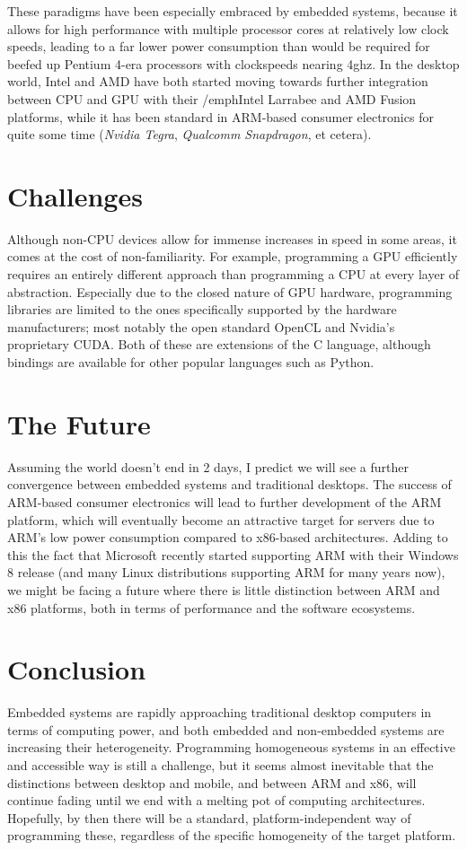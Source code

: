 \documentclass[a4paper]{article}
\begin{document}
These paradigms have been especially embraced by embedded systems, because it
allows for high performance with multiple processor cores at relatively low
clock speeds, leading to a far lower power consumption than would be required
for beefed up Pentium 4-era processors with clockspeeds nearing 4ghz.  In the
desktop world, Intel and AMD have both started moving towards further
integration between CPU and GPU with their /emph{Intel Larrabee} and {AMD
Fusion} platforms, while it has been standard in ARM-based consumer electronics
for quite some time (\emph{Nvidia Tegra}, \emph{Qualcomm Snapdragon}, et
cetera).

\section{Challenges}
Although non-CPU devices allow for immense increases in speed in some areas, it
comes at the cost of non-familiarity. For example, programming a GPU
efficiently requires an entirely different approach than programming a CPU at
every layer of abstraction. Especially due to the closed nature of GPU hardware,
programming libraries are limited to the ones specifically supported by the
hardware manufacturers; most notably the open standard
OpenCL\cite{stone2010opencl} and Nvidia's proprietary
CUDA\cite{nvidia2008programming}. Both of these  are extensions of the C
language, although bindings are available for other popular languages such as
Python.

\section{The Future}
Assuming the world doesn't end in 2 days, I predict we will see a further
convergence between embedded systems and traditional desktops. The success of
ARM-based consumer electronics will lead to further development of the ARM
platform, which will eventually become an attractive target for servers due to
ARM's low power consumption compared to x86-based architectures. Adding to this
the fact that Microsoft recently started supporting ARM with their Windows 8
release (and many Linux distributions supporting ARM for many years now), we
might be facing a future where there is little distinction between ARM and x86
platforms, both in terms of performance and the software ecosystems.

\section{Conclusion}
Embedded systems are rapidly approaching traditional desktop computers in terms of
computing power, and both embedded and non-embedded systems are increasing their
heterogeneity. Programming homogeneous systems in an effective and accessible
way is still a challenge, but it seems almost inevitable that the distinctions
between desktop and mobile, and between ARM and x86, will continue fading until
we end with a melting pot of computing architectures. Hopefully, by then there
will be a standard, platform-independent way of programming these, regardless of
the specific homogeneity of the target platform.




\end{document}
